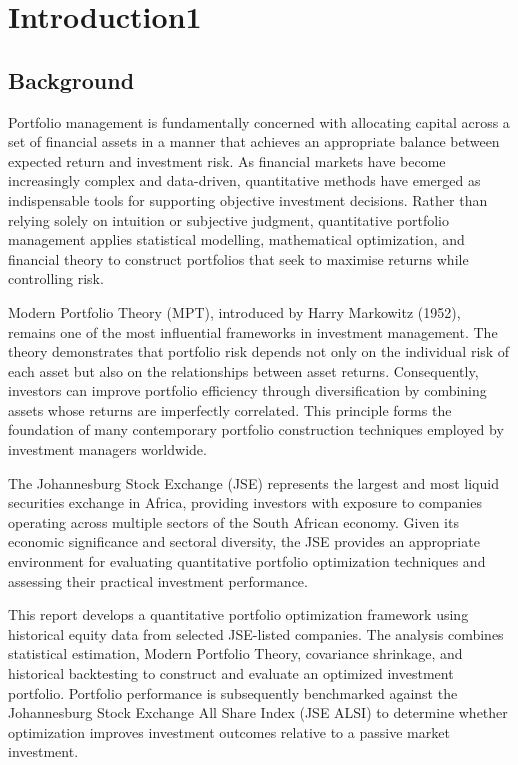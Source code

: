 \chapter*{Introduction1}

\section{Background}

Portfolio management is fundamentally concerned with allocating capital across a set of financial assets in a manner that achieves an appropriate balance between expected return and investment risk. As financial markets have become increasingly complex and data-driven, quantitative methods have emerged as indispensable tools for supporting objective investment decisions. Rather than relying solely on intuition or subjective judgment, quantitative portfolio management applies statistical modelling, mathematical optimization, and financial theory to construct portfolios that seek to maximise returns while controlling risk.

Modern Portfolio Theory (MPT), introduced by Harry Markowitz (1952), remains one of the most influential frameworks in investment management. The theory demonstrates that portfolio risk depends not only on the individual risk of each asset but also on the relationships between asset returns. Consequently, investors can improve portfolio efficiency through diversification by combining assets whose returns are imperfectly correlated. This principle forms the foundation of many contemporary portfolio construction techniques employed by investment managers worldwide.

The Johannesburg Stock Exchange (JSE) represents the largest and most liquid securities exchange in Africa, providing investors with exposure to companies operating across multiple sectors of the South African economy. Given its economic significance and sectoral diversity, the JSE provides an appropriate environment for evaluating quantitative portfolio optimization techniques and assessing their practical investment performance.

This report develops a quantitative portfolio optimization framework using historical equity data from selected JSE-listed companies. The analysis combines statistical estimation, Modern Portfolio Theory, covariance shrinkage, and historical backtesting to construct and evaluate an optimized investment portfolio. Portfolio performance is subsequently benchmarked against the Johannesburg Stock Exchange All Share Index (JSE ALSI) to determine whether optimization improves investment outcomes relative to a passive market investment.

